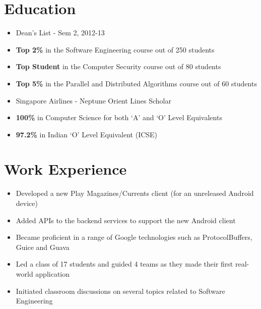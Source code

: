 \documentclass[11pt,a4paper]{moderncv}
\begin{document}
\makecvtitle

\section{Education}
{\begin{itemize}
    \item Dean's List - Sem 2, 2012-13
    \item \textbf{Top 2\%} in the Software Engineering course out of 250 students
    \item \textbf{Top Student} in the Computer Security course out of 80 students
    \item \textbf{Top 5\%} in the Parallel and Distributed Algorithms course out of 60 students
    \item Singapore Airlines - Neptune Orient Lines Scholar
 \end{itemize}}

{\begin{itemize}
            \item \textbf{100\%} in Computer Science for both `A' and `O' Level Equivalents
            \item \textbf{97.2\%} in Indian `O' Level Equivalent (ICSE)
 \end{itemize}}

\section{Work Experience}
{\begin{itemize}
        \item Developed a new Play Magazines/Currents client (for an unreleased Android device)
        \item Added APIs to the backend services to support the new Android client
        \item Became proficient in a range of Google technologies such as ProtocolBuffers, Guice and Guava
 \end{itemize}}
{\begin{itemize}
        \item Led a class of 17 students and guided 4 teams as they made their first real-world application
        \item Initiated classroom discussions on several topics related to Software Engineering
 \end{itemize}}
\end{document}
